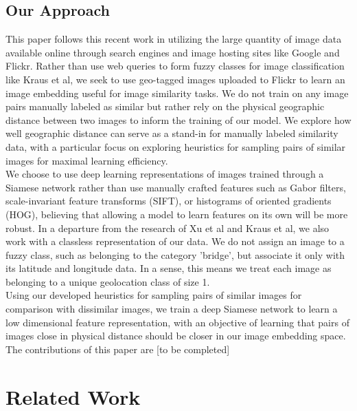 \documentclass[pageno]{jpaper}
\begin{document}
\subsection*{Our Approach}
This paper follows this recent work in utilizing the large quantity of image data available online through search engines and image hosting sites like Google and Flickr. Rather than use web queries to form fuzzy classes for image classification like Kraus et al, we seek to use geo-tagged images uploaded to Flickr to learn an image embedding useful for image similarity tasks. We do not train on any image pairs manually labeled as similar but rather rely on the physical geographic distance between two images to inform the training of our model. We explore how well geographic distance can serve as a stand-in for manually labeled similarity data, with a particular focus on exploring heuristics for sampling pairs of similar images for maximal learning efficiency.\\

We choose to use deep learning representations of images trained through a Siamese network rather than use manually crafted features such as Gabor filters, scale-invariant feature transforms (SIFT), or histograms of oriented gradients (HOG), believing that allowing a model to learn features on its own will be more robust. In a departure from the research of Xu et al and Kraus et al, we also work with a classless representation of our data. We do not assign an image to a fuzzy class, such as belonging to the category 'bridge', but associate it only with its latitude and longitude data. In a sense, this means we treat each image as belonging to a unique geolocation class of size 1.\\

Using our developed heuristics for sampling pairs of similar images for comparison with dissimilar images, we train a deep Siamese network to learn a low dimensional feature representation, with an objective of learning that pairs of images close in physical distance should be closer in our image embedding space.\\

The contributions of this paper are [to be completed]

\section{Related Work}
\end{document}
